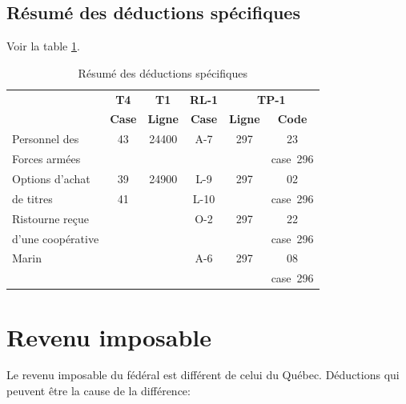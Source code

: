 \subsection{Résumé des déductions spécifiques}
Voir la table \ref{table:resumeDesDeductionsSpecifiques}.
\begin{table}
	\centering
	\begin{tabular}{|l|c|c|c|c|c|}
		\hline
		                  &  \textbf{T4}  &  \textbf{T1}   & \textbf{RL-1} & \multicolumn{2}{c|}{\textbf{TP-1}} \\ \cline{5-6}
		                  & \textbf{Case} & \textbf{Ligne} & \textbf{Case} & \textbf{Ligne} &   \textbf{Code}   \\ \hline
		Personnel des     &      43       &     24400      &      A-7      &      297       &        23         \\
		Forces armées     &               &                &               &                &     case~296      \\ \hline
		Options d'achat   &      39       &     24900      &      L-9      &      297       &        02         \\
		de titres         &      41       &                &     L-10      &                &     case~296      \\ \hline
		Ristourne reçue   &               &                &      O-2      &      297       &        22         \\
		d'une coopérative &               &                &               &                &     case~296      \\ \hline
		Marin             &               &                &      A-6      &      297       &        08         \\
		                  &               &                &               &                &     case~296      \\ \hline
	\end{tabular}
	\caption{Résumé des déductions spécifiques}
	\label{table:resumeDesDeductionsSpecifiques}
\end{table}




\section{Revenu imposable}
Le revenu imposable du fédéral est différent de celui du Québec. Déductions qui peuvent être la cause de la différence:

